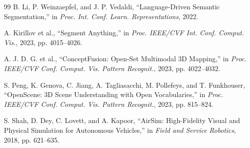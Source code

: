 \documentclass[letterpaper,10pt,conference]{ieeeconf}
\begin{document}
{\begin{thebibliography}{99}
B. Li, P. Weinzaepfel, and J. P. Vedaldi,
``Language-Driven Semantic Segmentation,'' in \emph{Proc. Int. Conf. Learn.
Representations}, 2022.

A. Kirillov et al.,
``Segment Anything,'' in \emph{Proc. IEEE/CVF Int. Conf. Comput. Vis.},
2023, pp. 4015--4026.

A. J. D. G. et al.,
``ConceptFusion: Open-Set Multimodal 3D Mapping,'' in \emph{Proc. IEEE/CVF
Conf. Comput. Vis. Pattern Recognit.}, 2023, pp. 4022--4032.

S. Peng, K. Genova, C. Jiang, A. Tagliasacchi, M. Pollefeys, and T. Funkhouser,
``OpenScene: 3D Scene Understanding with Open Vocabularies,'' in
\emph{Proc. IEEE/CVF Conf. Comput. Vis. Pattern Recognit.}, 2023,
pp. 815--824.

S. Shah, D. Dey, C. Lovett, and A. Kapoor,
``AirSim: High-Fidelity Visual and Physical Simulation for Autonomous Vehicles,''
in \emph{Field and Service Robotics}, 2018, pp. 621--635.
\end{thebibliography}
}
\end{document}
